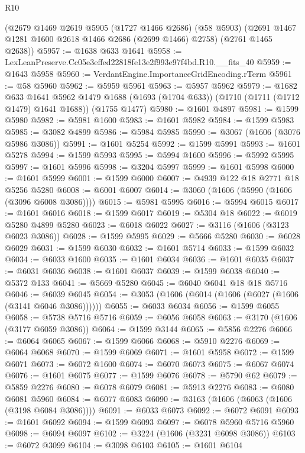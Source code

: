 \begin{lexlean}{R10}
\begin{coremodule}
    (@2679
      @1469
      @2619
      @5905
      (@1727 @1466 @2686)
      (@58 @5903)
      (@2691 @1467 @1281 @1600 @2618 @1466 @2686 (@2699 @1466) @2758)
      (@2761 @1465 @2638))
@5957 := @1638 @633 @1641
@5958 := LexLeanPreserve.Cc05e3effed22818fe13e2f993e97f4bd.R10.__fits_40
@5959 := @1643 @5958
@5960 := VerdantEngine.ImportanceGridEncoding.rTerm
@5961 := @58 @5960
@5962 := @5959 @5961
@5963 := @5957 @5962
@5979 := @1682
    @633
    @1641
    @5962
    @1479
    @1688
    (@1693 (@1704 @633))
    (@1710 (@1711 (@1712 @1479) @1641 @1688))
    (@1755 @1477)
@5980 := @1601 @4897
@5981 := @1599 @5980
@5982 := @5981 @1600
@5983 := @1601 @5982
@5984 := @1599 @5983
@5985 := @3082 @4899
@5986 := @5984 @5985
@5990 := @3067 (@1606 (@3076 @5986 @3086))
@5991 := @1601 @5254
@5992 := @1599 @5991
@5993 := @1601 @5278
@5994 := @1599 @5993
@5995 := @5994 @1600
@5996 := @5992 @5995
@5997 := @1601 @5996
@5998 := @3204 @5997
@5999 := @1601 @5998
@6000 := @1601 @5999
@6001 := @1599 @6000
@6007 := @4939 @122 @18 @2771 @18 @5256 @5280
@6008 := @6001 @6007
@6014 := @3060 (@1606 (@5990 (@1606 (@3096 @6008 @3086))))
@6015 := @5981 @5995
@6016 := @5994 @6015
@6017 := @1601 @6016
@6018 := @1599 @6017
@6019 := @5304 @18
@6022 := @6019 @5280 @4899 @5280
@6023 := @6018 @6022
@6027 := @3116 (@1606 (@3123 @6023 @3086))
@6028 := @1599 @5995
@6029 := @5666 @5280
@6030 := @6028 @6029
@6031 := @1599 @6030
@6032 := @1601 @5714
@6033 := @1599 @6032
@6034 := @6033 @1600
@6035 := @1601 @6034
@6036 := @1601 @6035
@6037 := @6031 @6036
@6038 := @1601 @6037
@6039 := @1599 @6038
@6040 := @5372 @133
@6041 := @5669 @5280
@6045 := @6040 @6041 @18 @18 @5716
@6046 := @6039 @6045
@6054 := @3053 (@1606 (@6014 (@1606 (@6027 (@1606 (@3141 @6046 @3086))))))
@6055 := @6033 @6034
@6056 := @1599 @6055
@6058 := @5738 @5716 @5716
@6059 := @6056 @6058
@6063 := @3170 (@1606 (@3177 @6059 @3086))
@6064 := @1599 @3144
@6065 := @5856 @2276
@6066 := @6064 @6065
@6067 := @1599 @6066
@6068 := @5910 @2276
@6069 := @6064 @6068
@6070 := @1599 @6069
@6071 := @1601 @5958
@6072 := @1599 @6071
@6073 := @6072 @1600
@6074 := @6070 @6073
@6075 := @6067 @6074
@6076 := @1601 @6075
@6077 := @1599 @6076
@6078 := @5790 @62
@6079 := @5859 @2276
@6080 := @6078 @6079
@6081 := @5913 @2276
@6083 := @6080 @6081 @5960
@6084 := @6077 @6083
@6090 := @3163 (@1606 (@6063 (@1606 (@3198 @6084 @3086))))
@6091 := @6033 @6073
@6092 := @6072 @6091
@6093 := @1601 @6092
@6094 := @1599 @6093
@6097 := @6078 @5960 @5716 @5960
@6098 := @6094 @6097
@6102 := @3224 (@1606 (@3231 @6098 @3086))
@6103 := @6072 @3099
@6104 := @3098 @6103
@6105 := @1601 @6104

\end{coremodule}
\end{lexlean}
